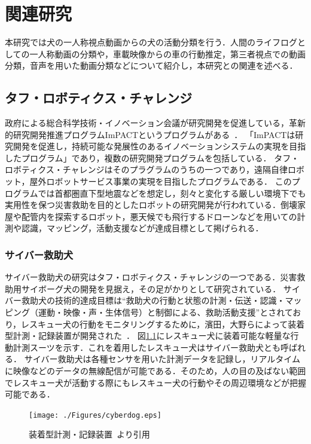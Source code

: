 \chapter{関連研究}
本研究では犬の一人称視点動画からの犬の活動分類を行う．人間のライフログとしての一人称動画の分類や，車載映像からの車の行動推定，第三者視点での動画分類，音声を用いた動画分類などについて紹介し，本研究との関連を述べる．

\section{タフ・ロボティクス・チャレンジ}
政府による総合科学技術・イノベーション会議が研究開発を促進している，革新的研究開発推進プログラムImPACTというプログラムがある~\cite{impact}．
「ImPACTは研究開発を促進し，持続可能な発展性のあるイノベーションシステムの実現を目指したプログラム」であり，複数の研究開発プログラムを包括している．
タフ・ロボティクス・チャレンジはそのプラグラムのうちの一つであり，遠隔自律ロボット，屋外ロボットサービス事業の実現を目指したプログラムである．
このプログラムでは首都圏直下型地震などを想定し，刻々と変化する厳しい環境下でも実用性を保つ災害救助を目的としたロボットの研究開発が行われている．倒壊家屋や配管内を探索するロボット，悪天候でも飛行するドローンなどを用いての計測や認識，マッピング，活動支援などが達成目標として掲げられる．

\subsection{サイバー救助犬}
サイバー救助犬の研究はタフ・ロボティクス・チャレンジの一つである．災害救助用サイボーグ犬の開発を見据え，その足がかりとして研究されている．
サイバー救助犬の技術的達成目標は``救助犬の行動と状態の計測・伝送・認識・マッピング（運動・映像・声・生体信号）と制御による、救助活動支援''とされており，レスキュー犬の行動をモニタリングするために，濱田，大野らによって装着型計測・記録装置が開発された~\cite{dog01}．
図\ref{cyberdog}にレスキュー犬に装着可能な軽量な行動計測スーツを示す．これを着用したレスキュー犬はサイバー救助犬とも呼ばれる．
サイバー救助犬は各種センサを用いた計測データを記録し，リアルタイムに映像などのデータの無線配信が可能である．そのため，人の目の及ばない範囲でレスキュー犬が活動する際にもレスキュー犬の行動やその周辺環境などが把握可能である．

\begin{figure}[htbp]
 \begin{center}
  \texttt{[image: ./Figures/cyberdog.eps]}
  \caption{装着型計測・記録装置~\cite{dog01}より引用}
  \label{cyberdog}
 \end{center}
\end{figure}

